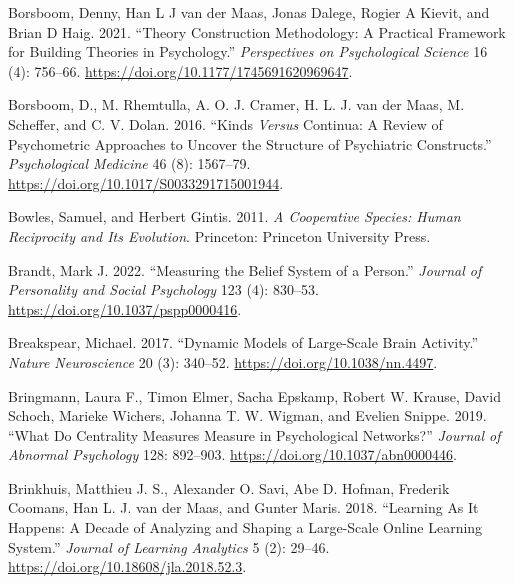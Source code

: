\documentclass[
  a4paper,
  DIV=11,
  numbers=noendperiod,
  oneside]{scrreprt}
\newlength{\cslhangindent}
\newlength{\cslentryspacingunit} %
\newenvironment{CSLReferences}[2] %
 {%
  \setlength{\parindent}{0pt}
  \ifodd #1
  \let\oldpar\par
  \def\par{\hangindent=\cslhangindent\oldpar}
  \fi
  \setlength{\parskip}{#2\cslentryspacingunit}
 }%
 {}
\begin{document}
\begin{CSLReferences}{1}{0}
\leavevmode{}%
Borsboom, Denny, Han L J van der Maas, Jonas Dalege, Rogier A Kievit,
and Brian D Haig. 2021. {``Theory {Construction Methodology}: {A
Practical Framework} for {Building Theories} in {Psychology}.''}
\emph{Perspectives on Psychological Science} 16 (4): 756--66.
\url{https://doi.org/10.1177/1745691620969647}.

\leavevmode{}%
Borsboom, D., M. Rhemtulla, A. O. J. Cramer, H. L. J. van der Maas, M.
Scheffer, and C. V. Dolan. 2016. {``Kinds {\emph{Versus}} Continua: A
Review of Psychometric Approaches to Uncover the Structure of
Psychiatric Constructs.''} \emph{Psychological Medicine} 46 (8):
1567--79. \url{https://doi.org/10.1017/S0033291715001944}.

\leavevmode{}%
Bowles, Samuel, and Herbert Gintis. 2011. \emph{A Cooperative Species:
Human Reciprocity and Its Evolution}. {Princeton}: {Princeton University
Press}.

\leavevmode{}%
Brandt, Mark J. 2022. {``Measuring the Belief System of a Person.''}
\emph{Journal of Personality and Social Psychology} 123 (4): 830--53.
\url{https://doi.org/10.1037/pspp0000416}.

\leavevmode{}%
Breakspear, Michael. 2017. {``Dynamic Models of Large-Scale Brain
Activity.''} \emph{Nature Neuroscience} 20 (3): 340--52.
\url{https://doi.org/10.1038/nn.4497}.

\leavevmode{}%
Bringmann, Laura F., Timon Elmer, Sacha Epskamp, Robert W. Krause, David
Schoch, Marieke Wichers, Johanna T. W. Wigman, and Evelien Snippe. 2019.
{``What Do Centrality Measures Measure in Psychological Networks?''}
\emph{Journal of Abnormal Psychology} 128: 892--903.
\url{https://doi.org/10.1037/abn0000446}.

\leavevmode{}%
Brinkhuis, Matthieu J. S., Alexander O. Savi, Abe D. Hofman, Frederik
Coomans, Han L. J. van der Maas, and Gunter Maris. 2018. {``Learning {As
It Happens}: {A Decade} of {Analyzing} and {Shaping} a {Large-Scale
Online Learning System}.''} \emph{Journal of Learning Analytics} 5 (2):
29--46. \url{https://doi.org/10.18608/jla.2018.52.3}.


\end{CSLReferences}
\end{document}
